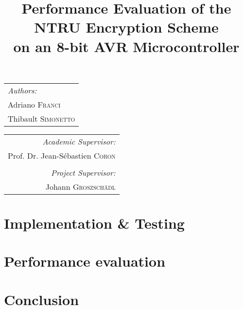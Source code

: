 \documentclass[11pt,a4paper]{article}
\begin{document}
\title{Performance Evaluation of the NTRU Encryption Scheme\\ on an 8-bit AVR 
Microcontroller}
\maketitle

\begin{tabular}[t]{@{}l} 
	\textit{Authors:}\\
	Adriano \textsc{Franci}\\
	Thibault \textsc{Simonetto}\\
\end{tabular}
\hfill
\begin{tabular}[t]{r@{}}
	\textit{Academic Supervisor:}\\
	Prof. Dr. Jean-S\'ebastien \textsc{Coron}\\
	\vspace{1em}\\
	\textit{Project Supervisor:}\\
	Johann \textsc{Groszsch\"adl}\\
\end{tabular}





\section{Implementation \& Testing}
\section{Performance evaluation}
\section{Conclusion}
\end{document}
